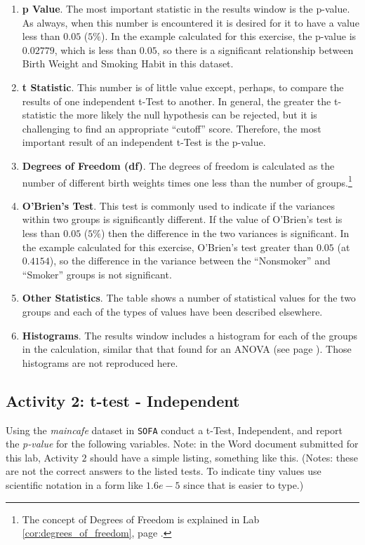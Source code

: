\begin{enumerate}
  \item \textbf{p Value}. The most important statistic in the results window is the p-value. As always, when this number is encountered it is desired for it to have a value less than $ 0.05 $ ($ 5\% $). In the example calculated for this exercise, the p-value is $ 0.02779 $, which is less than $ 0.05 $, so there is a significant relationship between Birth Weight and Smoking Habit in this dataset.
  \item \textbf{t Statistic}. This number is of little value except, perhaps, to compare the results of one independent t-Test to another. In general, the greater the t-statistic the more likely the null hypothesis can be rejected, but it is challenging to find an appropriate ``cutoff'' score. Therefore, the most important result of an independent t-Test is the p-value.
  \item \textbf{Degrees of Freedom (df)}. The degrees of freedom is calculated as the number of different birth weights times one less than the number of groups.\footnote{The concept of Degrees of Freedom is explained in Lab \ref{cor:degrees_of_freedom}, page \pageref{cor:degrees_of_freedom}.}
  \item \textbf{O'Brien's Test}. This test is commonly used to indicate if the variances within two groups is significantly different. If the value of O'Brien's test is less than $ 0.05 $ ($ 5\% $) then the difference in the two variances is significant. In the example calculated for this exercise, O'Brien's test greater than $ 0.05 $ (at $ 0.4154 $), so the difference in the variance between the ``Nonsmoker'' and ``Smoker'' groups is not significant.
  \item \textbf{Other Statistics}. The table shows a number of statistical values for the two groups and each of the types of values have been described elsewhere.
  \item \textbf{Histograms}. The results window includes a histogram for each of the groups in the calculation, similar that that found for an ANOVA (see page \pageref{hyp:no_histogram}). Those histograms are not reproduced here.
  
\end{enumerate}

\subsection{Activity 2: t-test - Independent} \label{para:act02}

Using the \textit{maincafe} dataset in \texttt{SOFA} conduct a t-Test, Independent, and report the \textit{p-value} for the following variables. Note: in the Word document submitted for this lab, Activity $ 2 $ should have a simple listing, something like this. (Notes: these are not the correct answers to the listed tests. To indicate tiny values use scientific notation in a form like $ 1.6e-5 $ since that is easier to type.)

